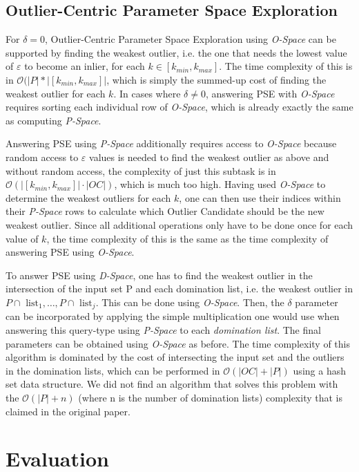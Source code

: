 \documentclass[runningheads]{llncs}
\begin{document}
\subsection{Outlier-Centric Parameter Space Exploration}
 
For $\delta=0$, Outlier-Centric Parameter Space Exploration using \emph{O-Space} can be supported by finding the weakest outlier, i.e. the one that needs the lowest value of $\varepsilon$ to become an inlier, for each $k \in [k_{min},k_{max}]$. The time complexity of this is in $\mathcal{O}(|P| * |[k_{min}, k_{max}]|$, which is simply the summed-up cost of finding the weakest outlier for each $k$. In cases where $\delta \neq 0$, answering PSE with \emph{O-Space} requires sorting each individual row of \emph{O-Space}, which is already exactly the same as computing \emph{P-Space}.

Answering PSE using \emph{P-Space} additionally requires access to \emph{O-Space} because random access to $\varepsilon$ values is needed to find the weakest outlier as above and without random access, the complexity of just this subtask is in $\mathcal{O}(|[k_{min},k_{max}]| \cdot |OC|)$, which is much too high. Having used \emph{O-Space} to determine the weakest outliers for each $k$, one can then use their indices within their \emph{P-Space} rows to calculate which Outlier Candidate should be the new weakest outlier. Since all additional operations only have to be done once for each value of $k$, the time complexity of this is the same as the time complexity of answering PSE using \emph{O-Space}.

To answer PSE using \emph{D-Space}, one has to find the weakest outlier in the intersection of the input set P and each domination list, i.e. the weakest outlier in $P \cap \text{ list}_1, \ldots ,P\cap\text{ list}_j$. This can be done using \emph{O-Space}. Then, the $\delta$ parameter can be incorporated by applying the simple multiplication one would use when answering this query-type using \emph{P-Space} to each \textit{domination list}. The final parameters can be obtained using \emph{O-Space} as before. The time complexity of this algorithm is dominated by the cost of intersecting the input set and the outliers in the domination lists, which can be performed in $\mathcal{O}(|OC| + |P|)$ using a hash set data structure. We did not find an algorithm that solves this problem with the $\mathcal{O}(|P| + n)$ (where n is the number of domination lists) complexity that is claimed in the original paper.
\section{Evaluation}
\end{document}
